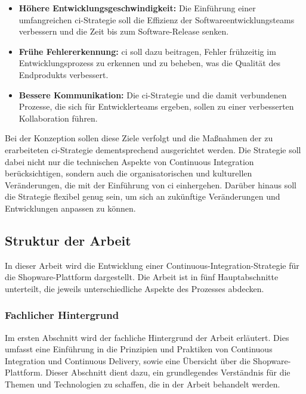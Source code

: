 \begin{itemize}
    \item \textbf{Höhere Entwicklungsgeschwindigkeit:} Die Einführung einer umfangreichen \acrshort{ci}-Strategie soll die
          Effizienz der Softwareentwicklungsteams verbessern und die Zeit bis zum Software-Release senken.

    \item \textbf{Frühe Fehlererkennung:} \acrshort{ci} soll dazu beitragen, Fehler frühzeitig im Entwicklungsprozess zu
          erkennen und zu beheben, was die Qualität des Endprodukts verbessert.

    \item \textbf{Bessere Kommunikation:} Die \acrshort{ci}-Strategie und die damit verbundenen Prozesse, die sich für
          Entwicklerteams ergeben, sollen zu einer verbesserten Kollaboration führen.
\end{itemize}

Bei der Konzeption sollen diese Ziele verfolgt und die Maßnahmen der zu erarbeiteten \acrshort{ci}-Strategie dementsprechend
ausgerichtet werden.
Die Strategie soll dabei nicht nur die technischen Aspekte von Continuous Integration berücksichtigen, sondern auch die
organisatorischen und kulturellen Veränderungen, die mit der Einführung von \acrshort{ci} einhergehen.
Darüber hinaus soll die Strategie flexibel genug sein, um sich an zukünftige Veränderungen und Entwicklungen anpassen
zu können.

\subsection{Struktur der Arbeit} \label{subsec:01-introduction-3}

In dieser Arbeit wird die Entwicklung einer Continuous-Integration-Strategie für die
Shopware-Plattform dargestellt.
Die Arbeit ist in fünf Hauptabschnitte unterteilt, die jeweils unterschiedliche Aspekte des Prozesses abdecken.

\subsubsection{Fachlicher Hintergrund}

Im ersten Abschnitt wird der fachliche Hintergrund der Arbeit erläutert.
Dies umfasst eine Einführung in die Prinzipien und Praktiken von Continuous Integration und Continuous Delivery,
sowie eine Übersicht über die Shopware-Plattform.
Dieser Abschnitt dient dazu, ein grundlegendes Verständnis für die Themen und Technologien zu schaffen, die in der
Arbeit behandelt werden.


